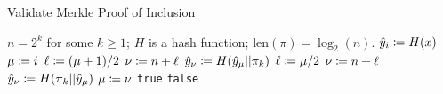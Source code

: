 \begin{algorithm}[p]
\caption{Validate Merkle Proof of Inclusion}
\label{alg:merkle_proof}
\begin{algorithmic}[1]
\Require $n = 2^{k}$ for some $k\ge1$; $H$ is a \gls{hash function}; $\text{len}(\pi) = \log_{2}(n)$.
    \State $\hat{y}_{i} \coloneqq{} H(x)$
    \State $\mu \coloneqq{} i$
            \State $\ell \coloneqq{} (\mu+1)/2$
            \State $\nu \coloneqq{} n + \ell$
            \State $\hat{y}_{\nu} \coloneqq{} H(\hat{y}_{\mu}||\pi_{k})$
        \Else
            \State $\ell \coloneqq{} \mu/2$
            \State $\nu \coloneqq{} n + \ell$
            \State $\hat{y}_{\nu} \coloneqq{} H(\pi_{k}||\hat{y}_{\mu})$
        \EndIf
        \State $\mu \coloneqq{} \nu$
    \EndFor
        \State \Return \texttt{true}
    \Else
        \State \Return \texttt{false}
    \EndIf
\EndProcedure
\end{algorithmic}
\end{algorithm}
